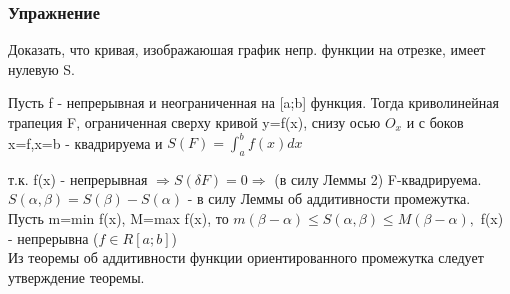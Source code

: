 \subsubsection{Упражнение}
Доказать, что кривая, изображаюшая график непр. функции на отрезке, имеет нулевую S.

\begin{teorema}
Пусть f - непрерывная и неограниченная на [a;b] функция. Тогда криволинейная трапеция F, ограниченная сверху кривой y=f(x), снизу осью $O_x$ и с боков x=f,x=b - квадрируема и $S(F)=\int_{a}^{b} f(x) dx$
\end{teorema}

\dokvo
т.к. f(x) - непрерывная $\Rightarrow S(\delta F)=0 \Rightarrow$ (в силу Леммы 2) F-квадрируема.
$S(\alpha,\beta)=S(\beta)-S(\alpha)$ - в силу Леммы об аддитивности промежутка.
\\
Пусть m=min f(x), M=max f(x), то $m(\beta-\alpha) \leq S(\alpha,\beta) \leq M(\beta-\alpha),$ f(x) - непрерывна ($f\in R[a;b]$)
\\
Из теоремы об аддитивности функции ориентированного промежутка следует утверждение теоремы.
\dokno











